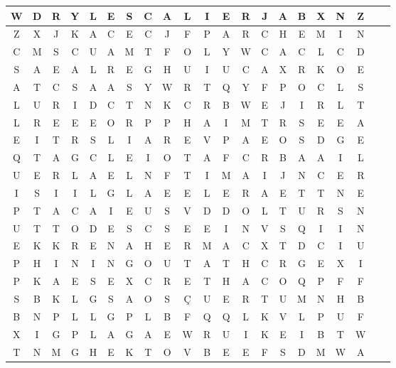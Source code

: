 \begin{minipage}{.61\textwidth}
	\renewcommand{\arraystretch}{1.5}
	\setlength{\tabcolsep}{4pt}
	\scriptsize{
	\begin{tabular}{|c*{20}{|c}}
	\hline
	W & D & R & Y & L & E & S & C & A & L & I & E & R & J & A & B & X & N & Z\\\hline
	Z & X & J & K & A & C & E & C & J & F & P & A & R & C & H & E & M & I & N\\\hline
	C & M & S & C & U & A & M & T & F & O & L & Y & W & C & A & C & L & C & D\\\hline
	S & A & E & A & L & R & E & G & H & U & I & U & C & A & X & R & K & O & E\\\hline
	A & T & C & S & A & A & S & Y & W & R & T & Q & Y & F & P & O & C & L & S\\\hline
	L & U & R & I & D & C & T & N & K & C & R & B & W & E & J & I & R & L & T\\\hline
	L & R & E & E & E & O & R & P & P & H & A & I & M & T & R & S & E & E & A\\\hline
	E & I & T & R & S & L & I & A & R & E & V & P & A & E & O & S & D & G & E\\\hline
	Q & T & A & G & C & L & E & I & O & T & A & F & C & R & B & A & A & I & L\\\hline
	U & E & R & L & A & E & L & N & F & T & I & M & A & I & J & N & C & E & R\\\hline
	I & S & I & I & L & G & L & A & E & E & L & E & R & A & E & T & T & N & E\\\hline
	P & T & A & C & A & I & E & U & S & V & D & D & O & L & T & U & R & S & N\\\hline
	U & T & T & O & D & E & S & C & S & E & E & I & N & V & S & Q & I & I & N\\\hline
	E & K & K & R & E & N & A & H & E & R & M & A & C & X & T & D & C & I & U\\\hline
	P & H & I & N & I & N & G & O & U & T & A & T & H & C & R & G & E & X & I\\\hline
	P & K & A & E & S & E & X & C & R & E & T & H & A & C & O & Q & P & F & F\\\hline
	S & B & K & L & G & S & A & O & S & Ç & U & E & R & T & U & M & N & H & B\\\hline
	B & N & P & L & L & G & P & L & B & F & Q & Q & L & K & V & L & P & U & F\\\hline
	X & I & G & P & L & A & G & A & E & W & R & U & I & K & E & I & B & T & W\\\hline
	T & N & M & G & H & E & K & T & O & V & B & E & E & F & S & D & M & W & A\\\hline

\end{tabular}}
\end{minipage}
